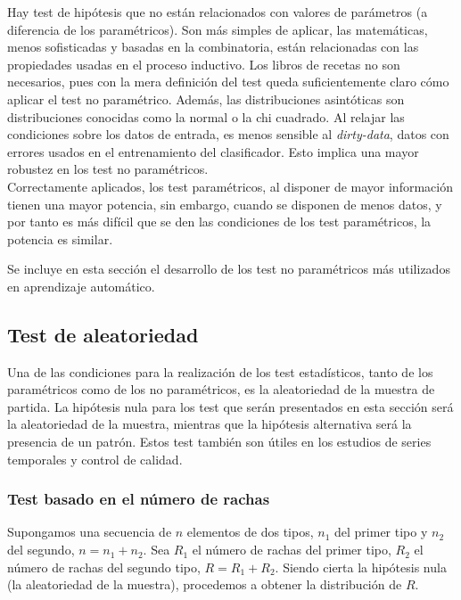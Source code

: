  	Hay test de hipótesis que no están relacionados con valores de parámetros (a diferencia de los paramétricos). Son más simples de aplicar, las matemáticas, menos sofisticadas y basadas en la combinatoria, están relacionadas con las propiedades usadas en el proceso inductivo. Los libros de recetas no son necesarios, pues con la mera definición del test queda suficientemente claro cómo aplicar el test no paramétrico. Además, las distribuciones asintóticas son distribuciones conocidas como la normal o la chi cuadrado. Al relajar las condiciones sobre los datos de entrada, es menos sensible al \textit{dirty-data}, datos con errores usados en el entrenamiento del clasificador. Esto implica una mayor robustez en los test no paramétricos.\\
 	
 	Correctamente aplicados, los test paramétricos, al disponer de mayor información tienen una mayor potencia, sin embargo, cuando se disponen de menos datos, y por tanto es más difícil que se den las condiciones de los test paramétricos, la potencia es similar.


 	Se incluye en esta sección el desarrollo de los test no paramétricos más utilizados en aprendizaje automático.
 	
 	
\subsection{Test de aleatoriedad}

	Una de las condiciones para la realización de los test estadísticos, tanto de los paramétricos como de los no paramétricos, es la aleatoriedad de la muestra de partida. La hipótesis nula para los test que serán presentados en esta sección será la aleatoriedad de la muestra, mientras que la hipótesis alternativa será la presencia de un patrón. Estos test también son útiles en los estudios de series temporales y control de calidad.
	
\subsubsection{Test basado en el número de rachas}

	Supongamos una secuencia de $n$ elementos de dos tipos, $n_1$ del primer tipo y $n_2$ del segundo, $n = n_1 + n_2$. Sea $R_1$ el número de rachas del primer tipo, $R_2$ el número de rachas del segundo tipo, $R = R_1 + R_2$. Siendo cierta la hipótesis nula (la aleatoriedad de la muestra), procedemos a obtener la distribución de $R$.
	
